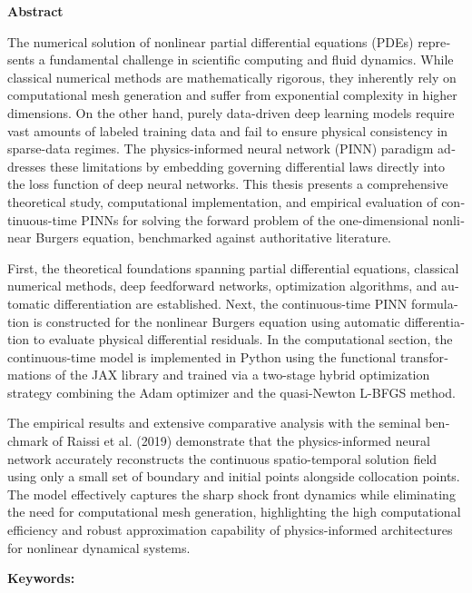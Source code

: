 \clearpage
{}
{}

\begin{singlespace}
\begin{latin}
\begin{center}
{\Large\bfseries Abstract}\\[0.4cm]
\end{center}

The numerical solution of nonlinear partial differential equations (PDEs) represents a fundamental challenge in scientific computing and fluid dynamics. While classical numerical methods are mathematically rigorous, they inherently rely on computational mesh generation and suffer from exponential complexity in higher dimensions. On the other hand, purely data-driven deep learning models require vast amounts of labeled training data and fail to ensure physical consistency in sparse-data regimes. The physics-informed neural network (PINN) paradigm addresses these limitations by embedding governing differential laws directly into the loss function of deep neural networks. This thesis presents a comprehensive theoretical study, computational implementation, and empirical evaluation of continuous-time PINNs for solving the forward problem of the one-dimensional nonlinear Burgers equation, benchmarked against authoritative literature.

First, the theoretical foundations spanning partial differential equations, classical numerical methods, deep feedforward networks, optimization algorithms, and automatic differentiation are established. Next, the continuous-time PINN formulation is constructed for the nonlinear Burgers equation using automatic differentiation to evaluate physical differential residuals. In the computational section, the continuous-time model is implemented in Python using the functional transformations of the JAX library and trained via a two-stage hybrid optimization strategy combining the Adam optimizer and the quasi-Newton L-BFGS method.

The empirical results and extensive comparative analysis with the seminal benchmark of Raissi et al. (2019) demonstrate that the physics-informed neural network accurately reconstructs the continuous spatio-temporal solution field using only a small set of boundary and initial points alongside collocation points. The model effectively captures the sharp shock front dynamics while eliminating the need for computational mesh generation, highlighting the high computational efficiency and robust approximation capability of physics-informed architectures for nonlinear dynamical systems.

\vspace{0.3cm}
\noindent\textbf{Keywords:} \KeywordsEn
\end{latin}
\end{singlespace}
